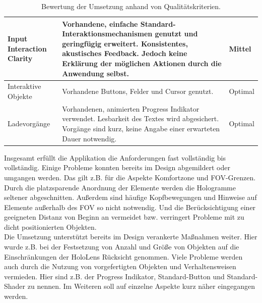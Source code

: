 \begin{landscape}
\begin{table}
\begin{tabular}{m{2.3cm}|m{15.5cm}|m{2cm}}
			\hline
			Input Interaction Clarity & Vorhandene, einfache Standard-Interaktionsmechanismen genutzt und geringfügig erweitert. Konsistentes, akustisches Feedback. Jedoch keine Erklärung der möglichen Aktionen durch die Anwendung selbst. & Mittel\\
			\hline
			Interaktive Objekte & Vorhandene Buttons, Felder und Cursor genutzt. & Optimal\\
			\hline
			Ladevorgänge & Vorhandenen, animierten Progress Indikator verwendet. Lesbarkeit des Textes wird abgesichert. Vorgänge sind kurz, keine Angabe einer erwarteten Dauer notwendig. & Optimal\\
		\end{tabular}\caption{\label{tab:tech_results} Bewertung der Umsetzung anhand von Qualitätskriterien.}
	\end{table}
	\egroup
\end{landscape}

Insgesamt erfüllt die Applikation die Anforderungen fast vollständig bis vollständig. Einige Probleme konnten bereits im Design abgemildert oder umgangen werden. Das gilt z.B. für die Aspekte Komfortzone und FOV-Grenzen. Durch die platzsparende Anordnung der Elemente werden die Hologramme seltener abgeschnitten. Außerdem sind häufige Kopfbewegungen und Hinweise auf Elemente außerhalb des FOV so nicht notwendig. Und die Berücksichtigung einer geeigneten Distanz von Beginn an vermeidet bzw. verringert Probleme mit zu dicht positionierten Objekten.\\

Die Umsetzung unterstützt bereits im Design verankerte Maßnahmen weiter. Hier wurde z.B. bei der Festsetzung von Anzahl und Größe von Objekten auf die Einschränkungen der HoloLens Rücksicht genommen. Viele Probleme werden auch durch die Nutzung von vorgefertigten Objekten und Verhaltensweisen vermieden. Hier sind z.B. der Progress Indikator, Standard-Button und Standard-Shader zu nennen. Im Weiteren soll auf einzelne Aspekte kurz näher eingegangen werden.\\

